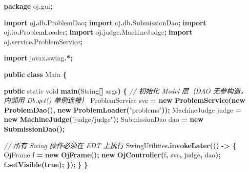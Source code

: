 \documentclass[
  11pt,
]{ctexart}
\newenvironment{Shaded}{\begin{snugshade}}{\end{snugshade}}
\newcommand{\BuiltInTok}[1]{#1}
\newcommand{\CommentTok}[1]{\textcolor[rgb]{0.56,0.35,0.01}{\textit{#1}}}
\newcommand{\DataTypeTok}[1]{\textcolor[rgb]{0.13,0.29,0.53}{#1}}
\newcommand{\FunctionTok}[1]{\textcolor[rgb]{0.13,0.29,0.53}{\textbf{#1}}}
\newcommand{\ImportTok}[1]{#1}
\newcommand{\KeywordTok}[1]{\textcolor[rgb]{0.13,0.29,0.53}{\textbf{#1}}}
\newcommand{\NormalTok}[1]{#1}
\newcommand{\OperatorTok}[1]{\textcolor[rgb]{0.81,0.36,0.00}{\textbf{#1}}}
\newcommand{\StringTok}[1]{\textcolor[rgb]{0.31,0.60,0.02}{#1}}
\begin{document}
\begin{Shaded}
\begin{Highlighting}[]
\KeywordTok{package}\ImportTok{ oj}\OperatorTok{.}\ImportTok{gui}\OperatorTok{;}

\KeywordTok{import} \ImportTok{oj}\OperatorTok{.}\ImportTok{db}\OperatorTok{.}\ImportTok{ProblemDao}\OperatorTok{;}
\KeywordTok{import} \ImportTok{oj}\OperatorTok{.}\ImportTok{db}\OperatorTok{.}\ImportTok{SubmissionDao}\OperatorTok{;}
\KeywordTok{import} \ImportTok{oj}\OperatorTok{.}\ImportTok{io}\OperatorTok{.}\ImportTok{ProblemLoader}\OperatorTok{;}
\KeywordTok{import} \ImportTok{oj}\OperatorTok{.}\ImportTok{judge}\OperatorTok{.}\ImportTok{MachineJudge}\OperatorTok{;}
\KeywordTok{import} \ImportTok{oj}\OperatorTok{.}\ImportTok{service}\OperatorTok{.}\ImportTok{ProblemService}\OperatorTok{;}

\KeywordTok{import} \ImportTok{javax}\OperatorTok{.}\ImportTok{swing}\OperatorTok{.*;}

\KeywordTok{public} \KeywordTok{class}\NormalTok{ Main }\OperatorTok{\{}

    \KeywordTok{public} \DataTypeTok{static} \DataTypeTok{void} \FunctionTok{main}\OperatorTok{(}\BuiltInTok{String}\OperatorTok{[]}\NormalTok{ args}\OperatorTok{)} \OperatorTok{\{}
        \CommentTok{// 初始化 Model 层（DAO 无参构造，内部用 Db.get() 单例连接）}
\NormalTok{        ProblemService svc   }\OperatorTok{=} \KeywordTok{new} \FunctionTok{ProblemService}\OperatorTok{(}\KeywordTok{new} \FunctionTok{ProblemDao}\OperatorTok{(),}
                                                  \KeywordTok{new} \FunctionTok{ProblemLoader}\OperatorTok{(}\StringTok{"problems"}\OperatorTok{));}
\NormalTok{        MachineJudge   judge }\OperatorTok{=} \KeywordTok{new} \FunctionTok{MachineJudge}\OperatorTok{(}\StringTok{"judge/judge"}\OperatorTok{);}
\NormalTok{        SubmissionDao  dao   }\OperatorTok{=} \KeywordTok{new} \FunctionTok{SubmissionDao}\OperatorTok{();}

        \CommentTok{// 所有 Swing 操作必须在 EDT 上执行}
        \BuiltInTok{SwingUtilities}\OperatorTok{.}\FunctionTok{invokeLater}\OperatorTok{(()} \OperatorTok{{-}\textgreater{}} \OperatorTok{\{}
\NormalTok{            OjFrame f }\OperatorTok{=} \KeywordTok{new} \FunctionTok{OjFrame}\OperatorTok{();}
            \KeywordTok{new} \FunctionTok{OjController}\OperatorTok{(}\NormalTok{f}\OperatorTok{,}\NormalTok{ svc}\OperatorTok{,}\NormalTok{ judge}\OperatorTok{,}\NormalTok{ dao}\OperatorTok{);}
\NormalTok{            f}\OperatorTok{.}\FunctionTok{setVisible}\OperatorTok{(}\KeywordTok{true}\OperatorTok{);}
        \OperatorTok{\});}
    \OperatorTok{\}}
\OperatorTok{\}}
\end{Highlighting}
\end{Shaded}
\end{document}

